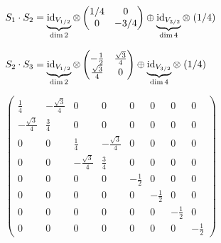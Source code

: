 \vspace*{1cm}
\begin{minipage}{0.5\textwidth}
\begin{align*}
S_1 \cdot S_2 
&=
\underbrace{\operatorname{id}_{V_{1/2}}}_{\dim 2}
\otimes
\begin{pmatrix}
  1/4 & 0  \\
  0 & -3/4
\end{pmatrix} 
\oplus
\underbrace{\operatorname{id}_{V_{3/2}}}_{\dim 4}
\otimes
\;(1/4) \\[0.8em]
S_2 \cdot S_3
&=
\underbrace{\operatorname{id}_{V_{1/2}}}_{\dim 2}
\otimes
\begin{pmatrix}
  -\frac{1}{2} & \frac{\sqrt{3}}{4} \\
  \frac{\sqrt{3}}{4} & 0
\end{pmatrix}
\oplus
\underbrace{\operatorname{id}_{V_{3/2}}}_{\dim 4}
\otimes
\;(1/4)
\end{align*}
\end{minipage}%
\begin{minipage}{0.5\textwidth}
\[
\begin{pmatrix}
\frac14 & -\frac{\sqrt{3}}{4} & 0 & 0 & 0 & 0 & 0 & 0\\
-\frac{\sqrt{3}}{4} & \frac34 & 0 & 0 & 0 & 0 & 0 & 0\\
0 & 0 & \frac14 & -\frac{\sqrt{3}}{4} & 0 & 0 & 0 & 0\\
0 & 0 & -\frac{\sqrt{3}}{4} & \frac34 & 0 & 0 & 0 & 0\\
0 & 0 & 0 & 0 & -\frac12 & 0 & 0 & 0\\
0 & 0 & 0 & 0 & 0 & -\frac12 & 0 & 0\\
0 & 0 & 0 & 0 & 0 & 0 & -\frac12 & 0\\
0 & 0 & 0 & 0 & 0 & 0 & 0 & -\frac12
\end{pmatrix}
\]
\end{minipage}


